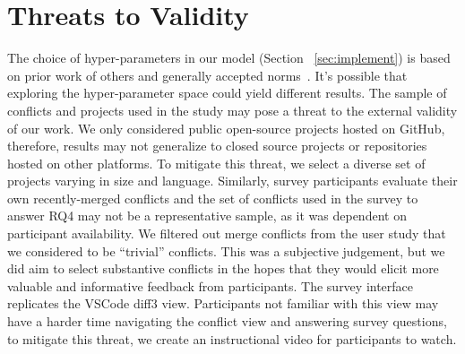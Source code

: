 \section{Threats to Validity}

The choice of hyper-parameters in our model (Section ~\ref{sec:implement}) is based on prior work of others and generally accepted norms~\cite{bert}.  It's possible that exploring the hyper-parameter space could yield different results.
The sample of conflicts and projects used in the study may pose a threat to the external validity of our work. We only considered public open-source projects hosted on GitHub, therefore, results may not generalize to closed source projects or repositories hosted on other platforms. To mitigate this threat, we select a diverse set of projects varying in size and language. Similarly, survey participants evaluate their own recently-merged conflicts and the set of conflicts used in the survey to answer RQ4 may not be a representative sample, as it was dependent on participant availability. We filtered out merge conflicts from the user study that we considered to be ``trivial'' conflicts.  This was a subjective judgement, but we did aim to select substantive conflicts in the hopes that they would elicit more valuable and informative feedback from participants.
The survey interface replicates the VSCode diff3 view. Participants not familiar with this view may have a harder time navigating the conflict view and answering survey questions, to mitigate this threat, we create an instructional video for participants to watch. 
 
 
